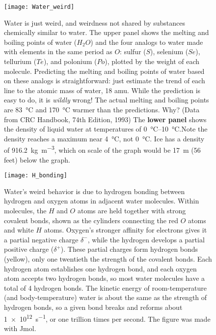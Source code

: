 {\newpage
\begin{figure}[p]
\centering
  \texttt{[image: Water\_weird]}%
\caption{Water is just weird, and weirdness not shared by substances chemically similar to water. The upper panel shows the melting and boiling points of water ($H_2O$) and the four analogs to water made with elements in the same period as $O$: sulfur ($S$), selenium ($Se$), tellurium ($Te$), and polonium ($Po$), plotted by the weight of each molecule. Predicting the melting and boiling points of water based on these analogs is straightforward: just estimate the trend of each line to the atomic mass of water, 18 amu. While the prediction is easy to do, it is \emph{wildly} wrong! The actual melting and boiling points are \SI{83}{\degreeCelsius} and \SI{170}{\degreeCelsius} warmer than the predictions. Why? (Data from CRC Handbook, 74th Edition, 1993) The \textbf{lower panel} shows the density of liquid water at temperatures of \SIrange{0}{10}{\degreeCelsius}.Note the density reaches a maximum near \SI{4}{\degreeCelsius}, not \SI{0}{\degreeCelsius}. Ice has a density of \SI{916.2}{\kilogram\per\metre^3}, which on scale of the graph would be \SI{17}{\metre} (56 feet) below the graph.}
\label{fig:wiw}
\end{figure}


\newpage
\begin{figure}[p]
\centering
  \texttt{[image: H\_bonding]}%
\caption{Water's weird behavior is due to hydrogen bonding between hydrogen and oxygen atoms in adjacent water molecules. Within molecules, the $H$ and $O$ atoms are held together with strong covalent bonds, shown as the cylinders connecting the red $O$ atoms and white $H$ atoms. Oxygen's stronger affinity for electrons gives it a partial negative charge $\delta^{-}$, while the hydrogen develops a partial positive charge ($\delta^{+}$). These partial charges form hydrogen bonds (yellow), only one twentieth the strength of the covalent bonds. Each hydrogen atom establishes one hydrogen bond, and each oxygen atom accepts two hydrogen bonds, so most water molecules have a total of 4 hydrogen bonds. The kinetic energy of room-temperature (and body-temperature) water is about the same as the strength of hydrogen bonds, so a given bond breaks and reforms about \SI{1e12}{s^{-1}}, or one trillion times per second. The figure was  made with Jmol.}
\label{fig:H_bonding}
\end{figure}

}

